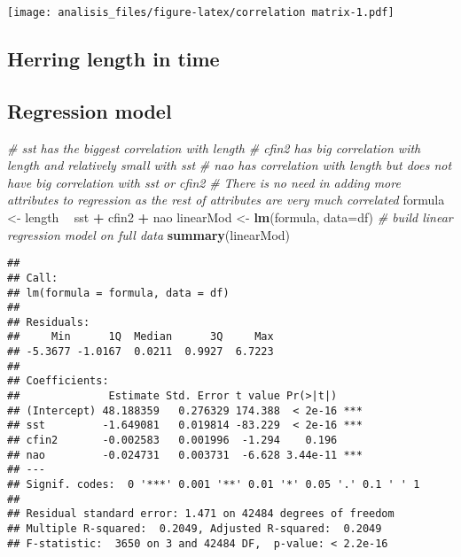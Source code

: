 \documentclass[]{article}
\newenvironment{Shaded}{\begin{snugshade}}{\end{snugshade}}
\newcommand{\CommentTok}[1]{\textcolor[rgb]{0.56,0.35,0.01}{\textit{#1}}}
\newcommand{\DataTypeTok}[1]{\textcolor[rgb]{0.13,0.29,0.53}{#1}}
\newcommand{\KeywordTok}[1]{\textcolor[rgb]{0.13,0.29,0.53}{\textbf{#1}}}
\newcommand{\NormalTok}[1]{#1}
\newcommand{\OperatorTok}[1]{\textcolor[rgb]{0.81,0.36,0.00}{\textbf{#1}}}
\newcommand{\StringTok}[1]{\textcolor[rgb]{0.31,0.60,0.02}{#1}}
\begin{document}
\texttt{[image: analisis\_files/figure-latex/correlation matrix-1.pdf]}

\hypertarget{herring-length-in-time}{%
\subsection{Herring length in time}\label{herring-length-in-time}}

\hypertarget{regression-model}{%
\subsection{Regression model}\label{regression-model}}

\begin{Shaded}
\begin{Highlighting}[]
\CommentTok{# sst has the biggest correlation with length}
\CommentTok{# cfin2 has big correlation with length and relatively small with sst}
\CommentTok{# nao has correlation with length but does not have big correlation with sst or cfin2}
\CommentTok{# There is no need in adding more attributes to regression as the rest of attributes are very much correlated}
\NormalTok{formula <-}\StringTok{ }\NormalTok{length }\OperatorTok{~}\StringTok{ }\NormalTok{sst }\OperatorTok{+}\StringTok{ }\NormalTok{cfin2 }\OperatorTok{+}\StringTok{ }\NormalTok{nao}
\NormalTok{linearMod <-}\StringTok{ }\KeywordTok{lm}\NormalTok{(formula, }\DataTypeTok{data=}\NormalTok{df)  }\CommentTok{# build linear regression model on full data}
\KeywordTok{summary}\NormalTok{(linearMod)}
\end{Highlighting}
\end{Shaded}

\begin{verbatim}
## 
## Call:
## lm(formula = formula, data = df)
## 
## Residuals:
##     Min      1Q  Median      3Q     Max 
## -5.3677 -1.0167  0.0211  0.9927  6.7223 
## 
## Coefficients:
##              Estimate Std. Error t value Pr(>|t|)    
## (Intercept) 48.188359   0.276329 174.388  < 2e-16 ***
## sst         -1.649081   0.019814 -83.229  < 2e-16 ***
## cfin2       -0.002583   0.001996  -1.294    0.196    
## nao         -0.024731   0.003731  -6.628 3.44e-11 ***
## ---
## Signif. codes:  0 '***' 0.001 '**' 0.01 '*' 0.05 '.' 0.1 ' ' 1
## 
## Residual standard error: 1.471 on 42484 degrees of freedom
## Multiple R-squared:  0.2049, Adjusted R-squared:  0.2049 
## F-statistic:  3650 on 3 and 42484 DF,  p-value: < 2.2e-16
\end{verbatim}
\end{document}
